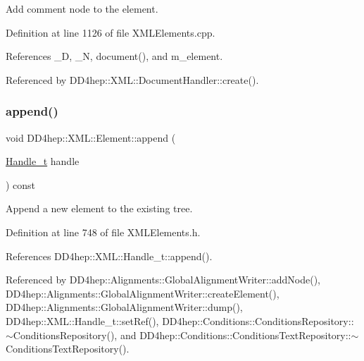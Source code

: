 Add comment node to the element. 



Definition at line 1126 of file X\+M\+L\+Elements.\+cpp.



References \+\_\+D, \+\_\+N, document(), and m\+\_\+element.



Referenced by D\+D4hep\+::\+X\+M\+L\+::\+Document\+Handler\+::create().

\hypertarget{class_d_d4hep_1_1_x_m_l_1_1_element_a5a6061e7c307966b99fc8ea50196d2c6}{}\label{class_d_d4hep_1_1_x_m_l_1_1_element_a5a6061e7c307966b99fc8ea50196d2c6} 
\subsubsection{\texorpdfstring{append()}{append()}}
{\footnotesize\ttfamily void D\+D4hep\+::\+X\+M\+L\+::\+Element\+::append (\begin{DoxyParamCaption}\item[{\hyperlink{class_d_d4hep_1_1_x_m_l_1_1_handle__t}{Handle\+\_\+t}}]{handle }\end{DoxyParamCaption}) const\hspace{0.3cm}{\ttfamily [inline]}}



Append a new element to the existing tree. 



Definition at line 748 of file X\+M\+L\+Elements.\+h.



References D\+D4hep\+::\+X\+M\+L\+::\+Handle\+\_\+t\+::append().



Referenced by D\+D4hep\+::\+Alignments\+::\+Global\+Alignment\+Writer\+::add\+Node(), D\+D4hep\+::\+Alignments\+::\+Global\+Alignment\+Writer\+::create\+Element(), D\+D4hep\+::\+Alignments\+::\+Global\+Alignment\+Writer\+::dump(), D\+D4hep\+::\+X\+M\+L\+::\+Handle\+\_\+t\+::set\+Ref(), D\+D4hep\+::\+Conditions\+::\+Conditions\+Repository\+::$\sim$\+Conditions\+Repository(), and D\+D4hep\+::\+Conditions\+::\+Conditions\+Text\+Repository\+::$\sim$\+Conditions\+Text\+Repository().

\hypertarget{class_d_d4hep_1_1_x_m_l_1_1_element_a47e97b105b492796c37a8232bcee6e02}{}\label{class_d_d4hep_1_1_x_m_l_1_1_element_a47e97b105b492796c37a8232bcee6e02} 
